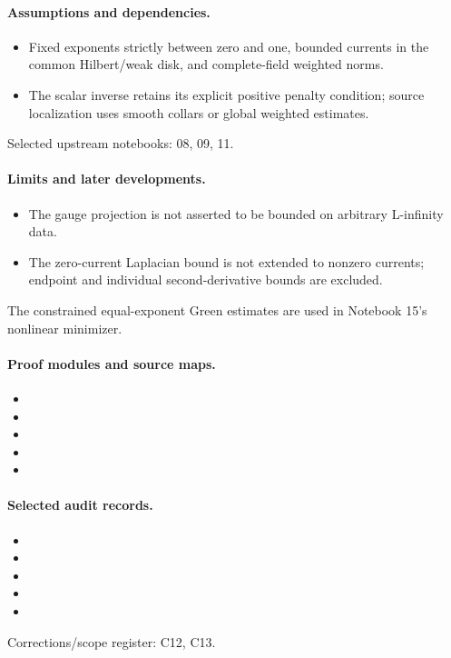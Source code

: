 \paragraph{Assumptions and dependencies.}
\begin{itemize}
\item Fixed exponents strictly between zero and one, bounded currents in the common Hilbert/weak disk, and complete-field weighted norms.
\item The scalar inverse retains its explicit positive penalty condition; source localization uses smooth collars or global weighted estimates.
\end{itemize}

Selected upstream notebooks: 08, 09, 11.\par

\paragraph{Limits and later developments.}
\begin{itemize}
\item The gauge projection is not asserted to be bounded on arbitrary L-infinity data.
\item The zero-current Laplacian bound is not extended to nonzero currents; endpoint and individual second-derivative bounds are excluded.
\end{itemize}

The constrained equal-exponent Green estimates are used in Notebook 15's nonlinear minimizer.

\paragraph{Proof modules and source maps.}
\begingroup\small
\begin{itemize}
\item {}
\item {}
\item {}
\item {}
\item {}
\end{itemize}
\endgroup

\paragraph{Selected audit records.}
\begingroup\small
\begin{itemize}
\item {}
\item {}
\item {}
\item {}
\item {}
\end{itemize}
\endgroup
Corrections/scope register: C12, C13.\par

